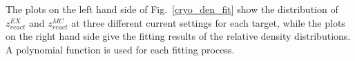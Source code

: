    The plots on the left hand side of Fig.~\ref{cryo_den_fit} show the distribution of $z_{react}^{EX}$ and $z_{react}^{MC}$ at three different current settings for each target, while the plots on the right hand side give the fitting results of the relative density distributions. A polynomial function is used for each fitting process. 
 \begin{figure}[!ht]
  \begin{center}
    \hfill
     \hfill
\end{center}
\end{figure}
